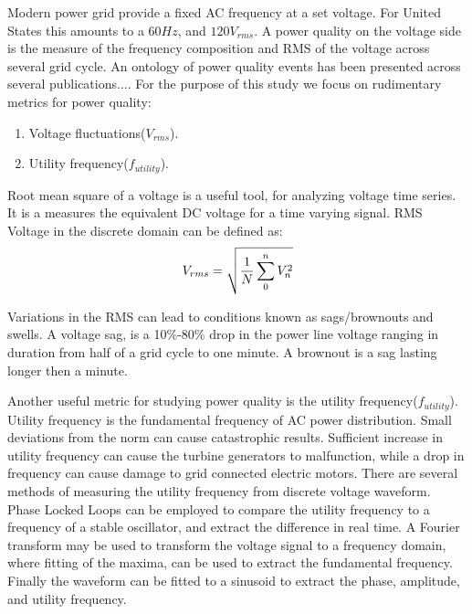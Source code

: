 	Modern power grid provide a fixed AC frequency at a set voltage. For United States
this amounts to a $60Hz$, and $120V_{rms}$. A power quality on the voltage side is the 
measure of the frequency composition and RMS of the voltage across several grid cycle.
An ontology of power quality events has been presented across several publications....
For the purpose of this study we focus on rudimentary metrics for power quality:

\begin{enumerate}
\item Voltage fluctuations($V_{rms}$).
\item Utility frequency($f_{utility}$).
\end{enumerate}

Root mean square of a voltage is a useful tool, for analyzing voltage time series.
It is a measures the equivalent DC voltage for a time varying signal.
RMS Voltage in the discrete domain can be defined as:
\begin{equation}
\label{eq:rms}
\centering
V_{rms} = \sqrt{\frac{1}{N} \sum_{0}^{n}{V_{n}^2}}
\end{equation}

Variations in the RMS can lead to conditions known as sags/brownouts and swells. A voltage sag,
is a 10\%-80\% drop in the power line voltage ranging in duration from half of a grid cycle
to one minute. A brownout is a sag lasting longer then a minute.

Another useful metric for studying power quality is the utility frequency($f_{utility}$). Utility frequency 
is the fundamental frequency of AC power distribution. Small deviations from the norm can cause 
catastrophic results. Sufficient increase in utility frequency can cause the turbine generators to
malfunction, while a drop in frequency can cause damage to grid connected electric motors.
There are several methods of measuring the utility frequency from  discrete voltage waveform. Phase Locked Loops can be employed
to compare the utility frequency to a frequency of a stable oscillator, and extract the difference in real time. 
A Fourier transform may be used to transform the voltage signal to a frequency domain, where fitting of the maxima,
can be used to extract the fundamental frequency. Finally the waveform  can be fitted to a sinusoid to extract the
phase, amplitude, and utility frequency.

